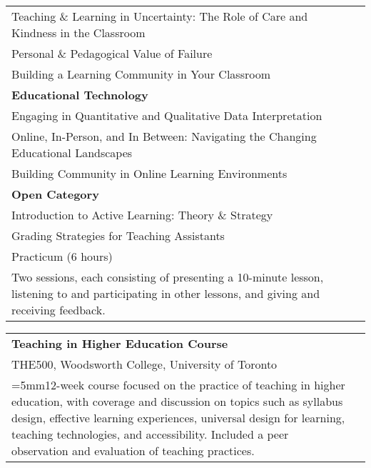 \documentclass[letterpaper,11pt,oneside]{article}
\begin{document}
\begin{longtable}{@{} >{\raggedright\arraybackslash}p{15.5cm} >{\raggedright\arraybackslash}p{1.7cm}}
  \hspace{5mm} Teaching \& Learning in Uncertainty: The Role of Care and Kindness in the Classroom & \\
  \hspace{5mm} Personal \& Pedagogical Value of Failure & \\
  \hspace{5mm} Building a Learning Community in Your Classroom & \\
\hspace{2mm} \textbf{Educational Technology} \\
  \hspace{5mm} Engaging in Quantitative and Qualitative Data Interpretation & \\
  \hspace{5mm} Online, In-Person, and In Between: Navigating the Changing Educational Landscapes & \\
  \hspace{5mm} Building Community in Online Learning Environments & \\
\hspace{2mm} \textbf{Open Category} \\
  \hspace{5mm} Introduction to Active Learning: Theory \& Strategy & \\
  \hspace{5mm} Grading Strategies for Teaching Assistants & \\

Practicum (6 hours) & \\
\hspace{2mm} \hangindent=5mm Two sessions, each consisting of presenting a 10-minute lesson, listening to and participating in other lessons, and giving and receiving feedback.

\end{longtable}


\def\arraystretch{1.1}
\noindent \begin{longtable}{@{} >{\raggedright\arraybackslash}p{15.5cm} >{\raggedright\arraybackslash}p{1.7cm}}


 \textbf{Teaching in Higher Education Course}  & 2022\\
THE500, Woodsworth College, University of Toronto \\
\hangindent=5mm12-week course focused on the practice of teaching in higher education, with coverage and discussion on topics such as syllabus design, effective learning experiences, universal design for learning, teaching technologies, and accessibility. Included a peer observation and evaluation of teaching practices. & \\
\end{longtable}
\end{document}
